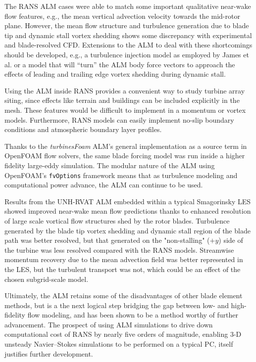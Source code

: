 The RANS ALM cases were able to match some important qualitative near-wake flow
features, e.g., the mean vertical advection velocity towards the mid-rotor
plane. However, the mean flow structure and turbulence generation due to blade
tip and dynamic stall vortex shedding shows some discrepancy with experimental
and blade-resolved CFD. Extensions to the ALM to deal with these shortcomings
should be developed, e.g., a turbulence injection model as employed by James et
al. \cite{James2010} or a model that will ``turn'' the ALM body force vectors to
approach the effects of leading and trailing edge vortex shedding during dynamic
stall.

Using the ALM inside RANS provides a convenient way to study turbine array
siting, since effects like terrain and buildings can be included explicitly in
the mesh. These features would be difficult to implement in a momentum or vortex
models. Furthermore, RANS models can easily implement no-slip boundary
conditions and atmospheric boundary layer profiles.

Thanks to the \textit{turbinesFoam} ALM's general implementation as a source
term in OpenFOAM flow solvers, the same blade forcing model was run inside a
higher fidelity large-eddy simulation. The modular nature of the ALM using
OpenFOAM's \texttt{fvOptions} framework means that as turbulence modeling and
computational power advance, the ALM can continue to be used.

Results from the UNH-RVAT ALM embedded within a typical Smagorinsky LES showed
improved near-wake mean flow predictions thanks to enhanced resolution of large
scale vortical flow structures shed by the rotor blades. Turbulence generated by
the blade tip vortex shedding and dynamic stall region of the blade path was
better resolved, but that generated on the "non-stalling" ($+y$) side of the
turbine was less resolved compared with the RANS models. Streamwise momentum
recovery due to the mean advection field was better represented in the LES, but
the turbulent transport was not, which could be an effect of the chosen
subgrid-scale model.

Ultimately, the ALM retains some of the disadvantages of other blade element
methods, but is a the next logical step bridging the gap between low- and
high-fidelity flow modeling, and has been shown to be a method worthy of further
advancement. The prospect of using ALM simulations to drive down computational
cost of RANS by nearly five orders of magnitude, enabling 3-D unsteady
Navier--Stokes simulations to be performed on a typical PC, itself justifies
further development.

